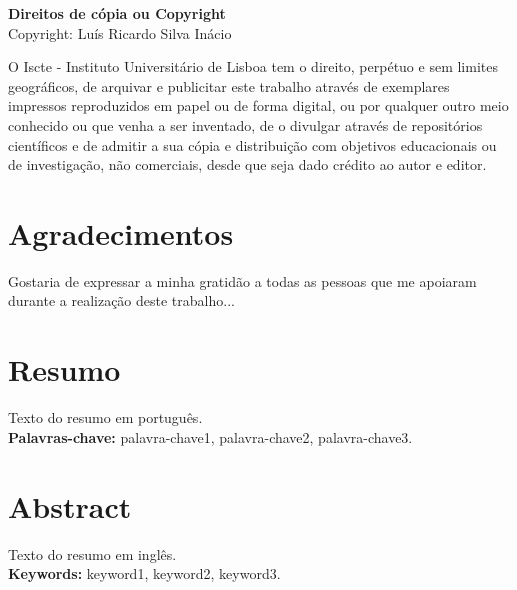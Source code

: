 \documentclass[a4paper,12pt]{report}
\begin{document}
	\newpage
	\thispagestyle{empty}
	\noindent %
	{\footnotesize %
		\textbf{Direitos de cópia ou Copyright} \\ %
		\textcopyright
		Copyright: Luís Ricardo Silva Inácio \\[-0.5cm] %
		\begin{flushleft} %
			\renewcommand{\baselinestretch}{1}\selectfont %
			\justify %
			O Iscte - Instituto Universitário de Lisboa tem o direito, perpétuo e sem limites geográficos, de arquivar e publicitar este trabalho através de exemplares impressos reproduzidos em papel ou de forma digital, ou por qualquer outro meio conhecido ou que venha a ser inventado, de o divulgar através de repositórios científicos e de admitir a sua cópia e distribuição com objetivos educacionais ou de investigação, não comerciais, desde que seja dado crédito ao autor e editor.
		\end{flushleft}
	}
	\newpage
	
	\chapter*{Agradecimentos}
	Gostaria de expressar a minha gratidão a todas as pessoas que me apoiaram durante a realização deste trabalho...
	
	\newpage
	\chapter*{Resumo}
	Texto do resumo em português. \\[1em]
	\textbf{Palavras-chave:} palavra-chave1, palavra-chave2, palavra-chave3.
	\newpage
	
	\chapter*{Abstract}
	Texto do resumo em inglês. \\[1em]
	\textbf{Keywords:} keyword1, keyword2, keyword3.
	\newpage
	
	\tableofcontents
	\newpage
	\listoffigures
	\newpage
	\listoftables
	\newpage
	
\end{document}
